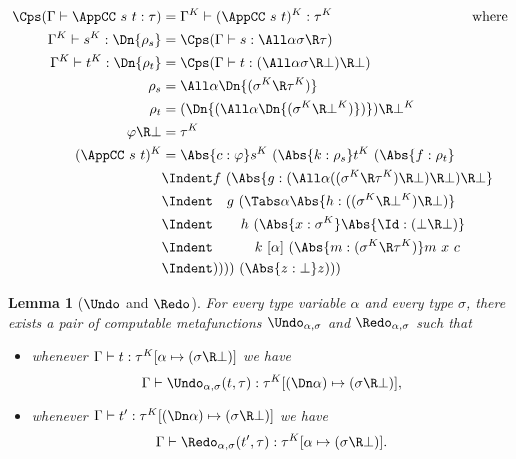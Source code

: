 \documentclass{amsart}
\let\phi=\varphi %
\newtheorem{lemma}[subsection]{Lemma}
\begin{document}
\begin{align*}
\Cps(\Gamma \vdash \AppCC~s~t : \tau) & =
  \Gamma^K \vdash (\AppCC~s~t)^K : \tau^K
  \hspace{10em}\mbox{where}
  \\
\Gamma^K \vdash s^K : \Dn{\rho_s} & =
  \Cps(\Gamma \vdash s : \All\alpha \sigma \R \tau)
  \\
\Gamma^K \vdash t^K : \Dn{\rho_t} & =
  \Cps(\Gamma \vdash t : (\All\alpha \sigma \R \bot) \R \bot)
  \\
\rho_s & = \All\alpha \Dn{(\sigma^K \R \tau^K)}
  \\
\rho_t & = (\Dn{(\All\alpha \Dn{(\sigma^K\R\bot^K)})}) \R \bot^K
  \\
\phi \R \bot & = \tau^K
  \\
(\AppCC~s~t)^K & =
  \Abs{c:\phi} s^K~(\Abs{k : \rho_s} t^K~(\Abs{f:\rho_t}
  \\ &\Indent
  f~(\Abs{g : (\All\alpha ((\sigma^K \R \tau^K) \R\bot) \R\bot) \R\bot}
  \\ &\Indent\hspace{1em}
  g~(\Tabs\alpha \Abs{h : ((\sigma^K \R \bot^K) \R \bot)}
  \\ &\Indent\hspace{2em}
  h~(\Abs{x : \sigma^K}\Abs{\Id : (\bot\R\bot)}
  \\ &\Indent\hspace{3em}
  k~[\alpha]~(\Abs{m : (\sigma^K \R \tau^K)} m~x~c
  \\ &\Indent
  ))))~(\Abs{z : \bot}z)))
\end{align*}

\begin{lemma}
[$\Undo$ and $\Redo$]
\label{lem:undo-redo}
For every type variable $\alpha$ and every type $\sigma$, there
exists a pair of computable metafunctions $\Undo_{\alpha,\sigma}$
and $\Redo_{\alpha,\sigma}$ such that
\begin{itemize}
\item
whenever
$\Gamma \vdash t : \tau^K[\alpha \mapsto (\sigma\R\bot)]$
we have
\[
\Gamma \vdash \Undo_{\alpha,\sigma}(t,\tau) :
  \tau^K[(\Dn\alpha) \mapsto (\sigma\R\bot)],
\]
\item
whenever
$\Gamma \vdash t' : \tau^K[(\Dn\alpha) \mapsto (\sigma\R\bot)]$
we have
\[
\Gamma \vdash \Redo_{\alpha,\sigma}(t',\tau) :
  \tau^K[\alpha \mapsto (\sigma\R\bot)].
\]
\end{itemize}
\end{lemma}
\end{document}
